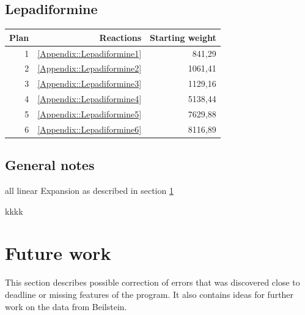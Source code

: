 \documentclass[a4paper,10pt,titlepage]{paper}
\begin{document}
\subsection{Lepadiformine}
\begin{table}[H]
\centering
\begin{tabular}{|r|r|r|}
\hline
Plan & Reactions & Starting weight \\ \hline
1 & \ref{Appendix::Lepadiformine1} & 841,29 \\\hline
2 & \ref{Appendix::Lepadiformine2} & 1061,41 \\\hline
3 & \ref{Appendix::Lepadiformine3} & 1129,16 \\\hline
4 & \ref{Appendix::Lepadiformine4} & 5138,44 \\\hline
5 & \ref{Appendix::Lepadiformine5} & 7629,88 \\\hline
6 & \ref{Appendix::Lepadiformine6} & 8116,89 \\\hline
\end{tabular}
\end{table}


\subsection{General notes }
all linear 
Expansion as described in section \ref{sec::FutureWork}

kkkk \cite{SynthesisPlans}\\

\section{Future work}
\label{sec::FutureWork}
This section describes possible correction of errors that was discovered close to deadline or missing features of the program. It also contains ideas for further work on the data from Beilstein.
\end{document}
